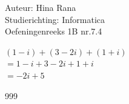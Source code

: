 \documentclass[a4paper]{article}
\begin{document}
\noindent \large Auteur: Hina Rana \\
\noindent \large Studierichting: Informatica\\
\noindent \large Oefeningenreeks 1B nr.7.4\\

\medskip

\normalsize
$(1-i) + (3-2i) + (1+i)$\\

$ = 1-i + 3-2i + 1+i$\\

$= -2i + 5$


\begin{thebibliography}{999}
\end{thebibliography}
\end{document}
